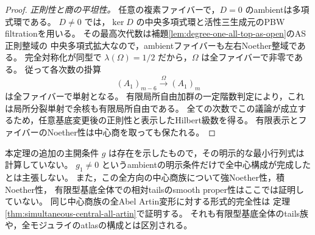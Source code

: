\begin{proof}
\emph{正則性と商の平坦性。}
任意の複素ファイバーで，$D=0$ のambientは多項式環である。
$D\ne0$ では，$\ker D$ の中央多項式環と活性三生成元のPBW filtrationを用いる。
その最高次代数は補題\ref{lem:degree-one-all-top-as-open}のAS正則整域の
中央多項式拡大なので，ambientファイバーも左右Noether整域である。
完全対称化が同型で $\lambda(\Omega)=1/2$ だから，$\Omega$ は全ファイバーで非零である。
従って各次数の掛算
\[
 (A_1)_{m-6}\xrightarrow{\ \Omega\ }(A_1)_m
\]
は全ファイバーで単射となる。
有限局所自由加群の一定階数判定により，これは局所分裂単射で余核も有限局所自由である。
全ての次数でこの議論が成立するため，任意基底変更後の正則性と表示したHilbert級数を得る。
有限表示とファイバーのNoether性は中心商を取っても保たれる。
\end{proof}

\begin{remark}
本定理の追加の主開条件 $g$ は存在を示したもので，その明示的な最小行列式は計算していない。
$g_1\ne0$ というambientの明示条件だけで全中心構成が完成したとは主張しない。
また，この全方向の中心商族について強Noether性，積Noether性，
有限型基底全体での相対tailsのsmooth proper性はここでは証明していない。
同じ中心商族の全Abel Artin変形に対する形式的完全性は
定理\ref{thm:simultaneous-central-all-artin}で証明する。
それも有限型基底全体のtails族や，全モジュライのatlasの構成とは区別される。
\end{remark}
